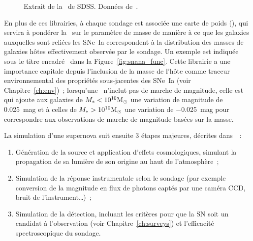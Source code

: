 \documentclass[../main/main.tex]{subfiles}
\begin{document}
\begin{figure}[ht]
    \centering
    \begin{minipage}{0.75\linewidth}
    \end{minipage}
    \caption[Extrait de la \simlib\ de SDSS]{Extrait de la \simlib\ de SDSS.
    Données de~\cite{kessler2013}.}
    \label{fig:sdssimlib}
\end{figure}

En plus de ces librairies, à chaque sondage est associée une carte de poids
(\wgtmap), qui servira à pondérer la \hostlib\ sur le paramètre de masse de
manière à ce que les galaxies auxquelles sont reliées les SNe~Ia correspondent à
la distribution des masses de galaxies hôtes effectivement observée par le
sondage. Un exemple est indiquée sous le titre encadré \wgtmap\ dans la
Figure~\ref{fig:snana_func}. Cette librairie a une importance capitale depuis
l'inclusion de la masse de l'hôte comme traceur environnemental des propriétés
sous-jacentes des SNe~Ia (voir Chapitre~\ref{ch:env})~; lorsqu'une \hostlib\
n'inclut pas de marche de magnitude, celle est qui ajoute aux galaxies de $M_* <
10^{10}\si{\Msun}$ une variation de magnitude de \SI{0.025}{mag} et à celles de
$M_* > 10^{10}\si{\Msun}$ une variation de \SI{-0.025}{mag} pour correspondre
aux observations de marche de magnitude basées sur la masse.

La simulation d'une supernova suit ensuite 3 étapes majeures, décrites
dans~\cite{kessler2019}~:
\begin{enumerate}
    \item Génération de la source et application d'effets cosmologiques,
        simulant la propagation de sa lumière de son origine au haut de
        l'atmosphère~;
    \item Simulation de la réponse instrumentale selon le sondage (par exemple
        conversion de la magnitude en flux de photons captés par une caméra CCD,
        bruit de l'instrument…)~;
    \item Simulation de la détection, incluant les critères pour que la SN soit
        un candidat à l'observation (voir Chapitre~\ref{ch:surveys}) et
        l'efficacité spectroscopique du sondage.
\end{enumerate}
\end{document}
